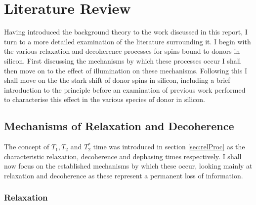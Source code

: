 
\chapter{Literature Review}
\label{chap:litRev}

Having introduced the background theory to the work discussed in this report, I turn to a more detailed examination of the literature surrounding it.
I begin with the various relaxation and decoherence processes for spins bound to donors in silicon.
First discussing the mechanisms by which these processes occur I shall then move on to the effect of illumination on these mechanisms.
Following this I shall move on the the stark shift of donor spins in silicon, including a brief introduction to the principle before an examination of previous work performed to characterise this effect in the various species of donor in silicon.


\section{Mechanisms of Relaxation and Decoherence}
\label{sec:mechrelax}
The concept of $T_1, T_2$ and $T_2^*$ time was introduced in section \ref{sec:relProc} as the characteristic relaxation, decoherence and dephasing times respectively.
I shall now focus on the established mechanisms by which these occur, looking mainly at relaxation and decoherence as these represent a permanent loss of information.

\subsection{Relaxation}

